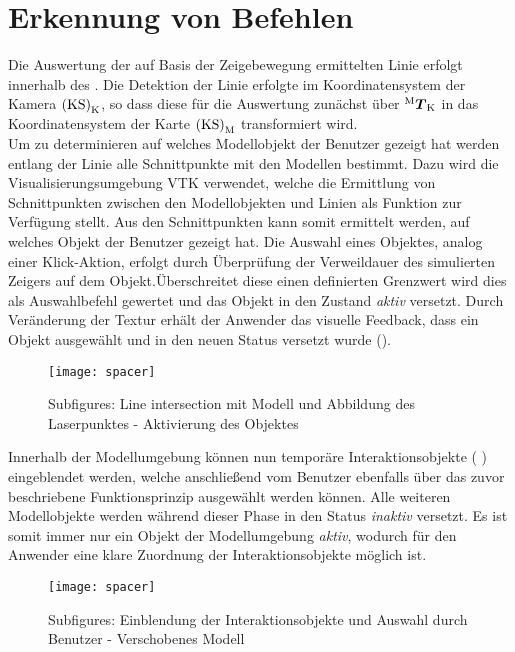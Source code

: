\section{Erkennung von Befehlen}
Die Auswertung der auf Basis der Zeigebewegung ermittelten Linie erfolgt innerhalb des \red[\mVisualization]. Die Detektion der Linie erfolgte im Koordinatensystem der Kamera ${\mathrm{(KS)}}_{\mathrm{K}}$, so dass diese für die Auswertung zunächst über ${^{\mathrm{M}}\mbox{\boldmath{$T$}}_{\mathrm{K}}}$ in das Koordinatensystem der Karte ${\mathrm{(KS)}}_{\mathrm{M}}$ transformiert wird.\\

Um zu determinieren auf welches Modellobjekt der Benutzer gezeigt hat werden entlang der Linie alle Schnittpunkte mit den Modellen bestimmt. Dazu wird die Visualisierungsumgebung VTK verwendet, welche die Ermittlung von Schnittpunkten zwischen den Modellobjekten und Linien als Funktion zur Verfügung stellt. Aus den Schnittpunkten kann somit ermittelt werden, auf welches Objekt der Benutzer gezeigt hat. Die Auswahl eines Objektes, analog einer \glqq Klick\grqq -Aktion, erfolgt durch Überprüfung der Verweildauer des simulierten Zeigers auf dem Objekt. Überschreitet diese einen definierten Grenzwert wird dies als Auswahlbefehl gewertet und das Objekt in den Zustand \textit{aktiv} versetzt. Durch Veränderung der Textur erhält der Anwender das visuelle Feedback, dass ein Objekt ausgewählt und in den neuen Status versetzt wurde ().\\

\begin{figure}[!ht]
	\begin{center}
		\texttt{[image: spacer]}
		\caption{Subfigures: Line intersection mit Modell und Abbildung des Laserpunktes - Aktivierung des Objektes}
		\label{fig.intintersect}
	\end{center}
\end{figure} 

Innerhalb der Modellumgebung können nun temporäre Interaktionsobjekte ( \red[(a)]) eingeblendet werden, welche anschließend vom Benutzer ebenfalls über das zuvor beschriebene Funktionsprinzip ausgewählt werden können. Alle weiteren Modellobjekte werden während dieser Phase in den Status \textit{inaktiv} versetzt. Es ist somit immer nur ein Objekt der Modellumgebung \textit{aktiv}, wodurch für den Anwender eine klare Zuordnung der Interaktionsobjekte möglich ist.

\begin{figure}[!ht]
	\begin{center}
		\texttt{[image: spacer]}
		\caption{Subfigures: Einblendung der Interaktionsobjekte und Auswahl durch Benutzer - Verschobenes Modell}
		\label{fig.intarrows}
	\end{center}
\end{figure} 

